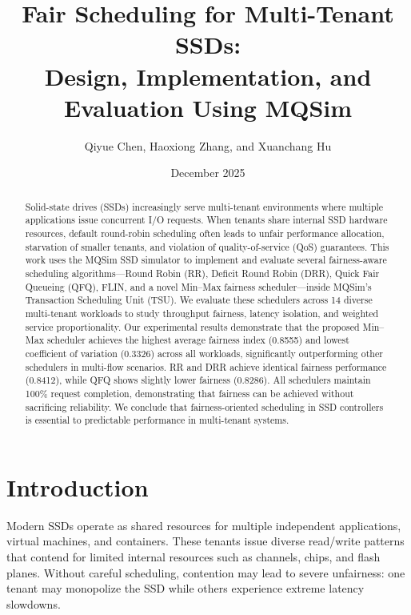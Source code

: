 \documentclass[11pt]{article}
\title{\textbf{Fair Scheduling for Multi-Tenant SSDs: \\ Design, Implementation, and Evaluation Using MQSim}}
\author{Qiyue Chen, Haoxiong Zhang, and Xuanchang Hu}
\date{December 2025}
\begin{document}
\maketitle

\begin{abstract}
Solid-state drives (SSDs) increasingly serve multi-tenant environments where multiple applications issue concurrent I/O requests. When tenants share internal SSD hardware resources, default round-robin scheduling often leads to unfair performance allocation, starvation of smaller tenants, and violation of quality-of-service (QoS) guarantees. This work uses the MQSim SSD simulator to implement and evaluate several fairness-aware scheduling algorithms—Round Robin (RR), Deficit Round Robin (DRR), Quick Fair Queueing (QFQ), FLIN, and a novel Min--Max fairness scheduler—inside MQSim's Transaction Scheduling Unit (TSU). We evaluate these schedulers across 14 diverse multi-tenant workloads to study throughput fairness, latency isolation, and weighted service proportionality. Our experimental results demonstrate that the proposed Min--Max scheduler achieves the highest average fairness index (0.8555) and lowest coefficient of variation (0.3326) across all workloads, significantly outperforming other schedulers in multi-flow scenarios. RR and DRR achieve identical fairness performance (0.8412), while QFQ shows slightly lower fairness (0.8286). All schedulers maintain 100\% request completion, demonstrating that fairness can be achieved without sacrificing reliability. We conclude that fairness-oriented scheduling in SSD controllers is essential to predictable performance in multi-tenant systems.
\end{abstract}

\section{Introduction}

Modern SSDs operate as shared resources for multiple independent applications, virtual machines, and containers. These tenants issue diverse read/write patterns that contend for limited internal resources such as channels, chips, and flash planes. Without careful scheduling, contention may lead to severe unfairness: one tenant may monopolize the SSD while others experience extreme latency slowdowns.
\end{document}
